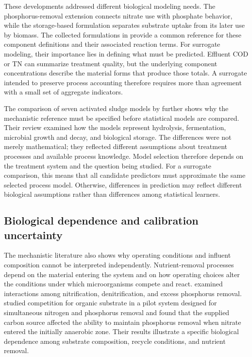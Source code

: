 These developments addressed different biological modeling needs. The phosphorus-removal extension connects nitrate use with phosphate behavior, while the storage-based formulation separates substrate uptake from its later use by biomass. The collected formulations in \citet{Henze2006} provide a common reference for these component definitions and their associated reaction terms. For surrogate modeling, their importance lies in defining what must be predicted. Effluent COD or TN can summarize treatment quality, but the underlying component concentrations describe the material forms that produce those totals. A surrogate intended to preserve process accounting therefore requires more than agreement with a small set of aggregate indicators.

The comparison of seven activated sludge models by \citet{Hauduc2013} further shows why the mechanistic reference must be specified before statistical models are compared. Their review examined how the models represent hydrolysis, fermentation, microbial growth and decay, and biological storage. The differences were not merely mathematical; they reflected different assumptions about treatment processes and available process knowledge. Model selection therefore depends on the treatment system and the question being studied. For a surrogate comparison, this means that all candidate predictors must approximate the same selected process model. Otherwise, differences in prediction may reflect different biological assumptions rather than differences among statistical learners.

\subsection{Biological dependence and calibration uncertainty}

The mechanistic literature also shows why operating conditions and influent composition cannot be interpreted independently. Nutrient-removal processes depend on the material entering the system and on how operating choices alter the conditions under which microorganisms compete and react. \citet{Wentzel1992} examined interactions among nitrification, denitrification, and excess phosphorus removal. \citet{Guerrero2011} studied competition for organic substrate in a pilot system designed for simultaneous nitrogen and phosphorus removal and found that the supplied carbon source affected the ability to maintain phosphorus removal when nitrate entered the initially anaerobic zone. Their results illustrate a specific biological dependence among substrate composition, recycle conditions, and nutrient removal.

